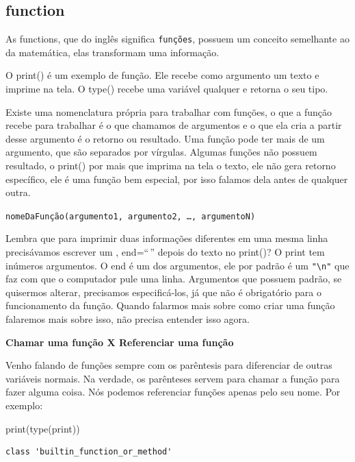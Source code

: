 \documentclass[
  letterpaper,
  DIV=11,
  numbers=noendperiod]{scrreprt}
\newenvironment{Shaded}{\begin{snugshade}}{\end{snugshade}}
\newcommand{\BuiltInTok}[1]{\textcolor[rgb]{0.00,0.23,0.31}{#1}}
\newcommand{\NormalTok}[1]{\textcolor[rgb]{0.00,0.23,0.31}{#1}}
\begin{document}
\hypertarget{function}{%
\subsection{function}\label{function}}

As functions, que do inglês significa \texttt{funções}, possuem um
conceito semelhante ao da matemática, elas transformam uma informação.

O print() é um exemplo de função. Ele recebe como argumento um texto e
imprime na tela. O type() recebe uma variável qualquer e retorna o seu
tipo.

Existe uma nomenclatura própria para trabalhar com funções, o que a
função recebe para trabalhar é o que chamamos de argumentos e o que ela
cria a partir desse argumento é o retorno ou resultado. Uma função pode
ter mais de um argumento, que são separados por vírgulas. Algumas
funções não possuem resultado, o print() por mais que imprima na tela o
texto, ele não gera retorno específico, ele é uma função bem especial,
por isso falamos dela antes de qualquer outra.

\texttt{nomeDaFunção(argumento1,\ argumento2,\ …,\ argumentoN)}

Lembra que para imprimir duas informações diferentes em uma mesma linha
precisávamos escrever um , end=``\,'' depois do texto no print()? O
print tem inúmeros argumentos. O end é um dos argumentos, ele por padrão
é um \texttt{"\textbackslash{}n"} que faz com que o computador pule uma
linha. Argumentos que possuem padrão, se quisermos alterar, precisamos
especificá-los, já que não é obrigatório para o funcionamento da função.
Quando falarmos mais sobre como criar uma função falaremos mais sobre
isso, não precisa entender isso agora.

\textbf{Chamar uma função X Referenciar uma função}

Venho falando de funções sempre com os parêntesis para diferenciar de
outras variáveis normais. Na verdade, os parênteses servem para chamar a
função para fazer alguma coisa. Nós podemos referenciar funções apenas
pelo seu nome. Por exemplo:

\begin{Shaded}
\begin{Highlighting}[]
\BuiltInTok{print}\NormalTok{(}\BuiltInTok{type}\NormalTok{(}\BuiltInTok{print}\NormalTok{))}
\end{Highlighting}
\end{Shaded}

\begin{tcolorbox}[enhanced jigsaw, breakable, leftrule=.75mm, left=2mm, opacityback=0, bottomrule=.15mm, toprule=.15mm, rightrule=.15mm, arc=.35mm, colback=white]

\begin{verbatim}
class 'builtin_function_or_method'
\end{verbatim}

\end{tcolorbox}
\end{document}
